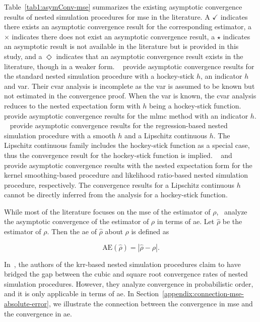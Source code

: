 Table~\ref{tab1:asymConv-mse} summarizes the existing asymptotic convergence results of nested simulation procedures for \gls{mse} in the literature.
A $\checkmark$ indicates there exists an asymptotic convergence result for the corresponding estimator,
a $\times$ indicates there does not exist an asymptotic convergence result, 
a $\star$ indicates an asymptotic result is not available in the literature but is provided in this study, and
a $\Diamond$ indicates that an asymptotic convergence result exists in the literature, though in a weaker form.
~\cite{gordy2010nested} provide asymptotic convergence results for the standard nested simulation procedure with a hockey-stick $h$, an indicator $h$ and \gls{var}.
Their \gls{cvar} analysis is incomplete as the \gls{var} is assumed to be known but not estimated in the convergence proof.
When the \gls{var} is known, the \gls{cvar} analysis reduces to the nested expectation form with $h$ being a hockey-stick function.
~\cite{giles2019multilevel} provide asymptotic convergence results for the \gls{mlmc} method with an indicator $h$.
~\cite{broadie2015risk} provide asymptotic convergence results for the regression-based nested simulation procedure with a smooth $h$ and a Lipschitz continuous $h$.
The Lipschitz continuous family includes the hockey-stick function as a special case, thus the convergence result for the hockey-stick function is implied.
~\cite{hong2017kernel} and~\cite{zhang2022sample} provide asymptotic convergence results with the nested expectation form for the kernel smoothing-based procedure and likelihood ratio-based nested simulation procedure, respectively.
The convergence results for a Lipschitz continuous $h$ cannot be directly inferred from the analysis for a hockey-stick function.

While most of the literature focuses on the \gls{mse} of the estimator of $\rho$,~\cite{wang2022smooth} analyze the asymptotic convergence of the estimator of $\rho$ in terms of \gls{ae}.
Let $\hat{\rho}$ be the estimator of $\rho$. 
Then the \gls{ae} of $\hat{\rho}$ about $\rho$ is defined as

$$
\mbox{AE}\left(\hat{\rho}\right) = \left| \hat{\rho} - \rho \right|.
$$

In~\cite{wang2022smooth}, the authors of the \gls{krr}-based nested simulation procedures claim to have bridged the gap between the cubic and square root convergence rates of nested simulation procedures. However, they analyze convergence in probabilistic order, and it is only applicable in terms of \gls{ae}. 
In Section~\ref{appendix:connection-mse-absolute-error}, we illustrate the connection between the convergence in \gls{mse} and the convergence in \gls{ae}.

